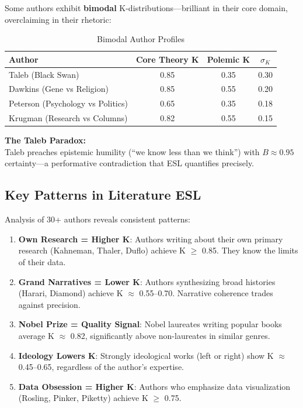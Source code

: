 \documentclass[11pt,a4paper]{article}
\begin{document}
Some authors exhibit \textbf{bimodal} K-distributions---brilliant in their core domain, overclaiming in their rhetoric:

\begin{table}[h]
\centering
\caption{Bimodal Author Profiles}
\begin{tabular}{lccc}
\toprule
\textbf{Author} & \textbf{Core Theory K} & \textbf{Polemic K} & \textbf{$\sigma_K$} \\
\midrule
Taleb (Black Swan) & 0.85 & 0.35 & 0.30 \\
Dawkins (Gene vs Religion) & 0.85 & 0.55 & 0.20 \\
Peterson (Psychology vs Politics) & 0.65 & 0.35 & 0.18 \\
Krugman (Research vs Columns) & 0.82 & 0.55 & 0.15 \\
\bottomrule
\end{tabular}
\end{table}

\begin{insightbox}
\textbf{The Taleb Paradox:} \\
Taleb preaches epistemic humility (``we know less than we think'') with $B \approx 0.95$ certainty---a performative contradiction that ESL quantifies precisely.
\end{insightbox}

\subsection{Key Patterns in Literature ESL}

Analysis of 30+ authors reveals consistent patterns:

\begin{enumerate}
    \item \textbf{Own Research = Higher K}: Authors writing about their own primary research (Kahneman, Thaler, Duflo) achieve K $\geq$ 0.85. They know the limits of their data.

    \item \textbf{Grand Narratives = Lower K}: Authors synthesizing broad histories (Harari, Diamond) achieve K $\approx$ 0.55--0.70. Narrative coherence trades against precision.

    \item \textbf{Nobel Prize = Quality Signal}: Nobel laureates writing popular books average K $\approx$ 0.82, significantly above non-laureates in similar genres.

    \item \textbf{Ideology Lowers K}: Strongly ideological works (left or right) show K $\approx$ 0.45--0.65, regardless of the author's expertise.

    \item \textbf{Data Obsession = Higher K}: Authors who emphasize data visualization (Rosling, Pinker, Piketty) achieve K $\geq$ 0.75.
\end{enumerate}
\end{document}

